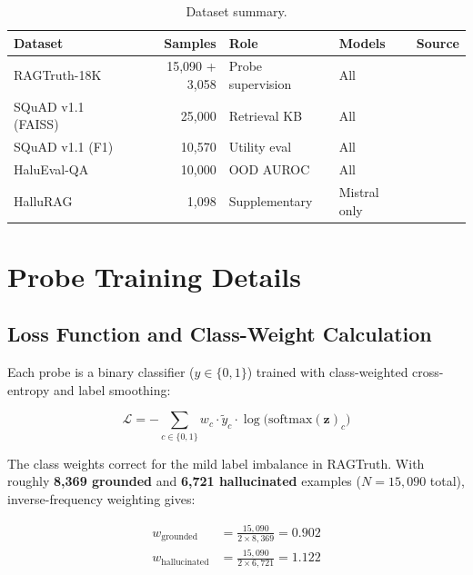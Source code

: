 \begin{table}[!htb]
\centering
\caption{Dataset summary.}
\label{tab:dataset_summary}
\small
\begin{tabular}{@{}lrlll@{}}
\toprule
\textbf{Dataset} & \textbf{Samples} & \textbf{Role} & \textbf{Models} & \textbf{Source} \\
\midrule
RAGTruth-18K & 15{,}090 + 3{,}058 & Probe supervision & All & \cite{wu2024ragtruth} \\
SQuAD v1.1 (FAISS) & 25{,}000 & Retrieval KB & All & \cite{rajpurkar2016squad} \\
SQuAD v1.1 (F1) & 10{,}570 & Utility eval & All & \cite{rajpurkar2016squad} \\
HaluEval-QA & 10{,}000 & OOD AUROC & All & \cite{li2023halueval} \\
HalluRAG & 1{,}098 & Supplementary & Mistral only & \cite{frohling2024hallurag} \\
\bottomrule
\end{tabular}
\end{table}

\section{Probe Training Details}
\label{sec:probe_training_details}

\subsection{Loss Function and Class-Weight Calculation}
\label{sec:loss_function}

Each probe is a binary classifier ($y \in \{0, 1\}$) trained with class-weighted cross-entropy and label smoothing:

\begin{equation}
    \mathcal{L} = -\sum_{c \in \{0,1\}} w_c \cdot \tilde{y}_c \cdot \log\bigl(\text{softmax}(\mathbf{z})_c\bigr)
    \label{eq:loss}
\end{equation}

\noindent The class weights correct for the mild label imbalance in RAGTruth. With roughly \textbf{8{,}369 grounded} and \textbf{6{,}721 hallucinated} examples ($N = 15{,}090$ total), inverse-frequency weighting gives:

\begin{align}
    w_{\text{grounded}} &= \frac{15{,}090}{2 \times 8{,}369} = 0.902 \\[4pt]
    w_{\text{hallucinated}} &= \frac{15{,}090}{2 \times 6{,}721} = 1.122
\end{align}

